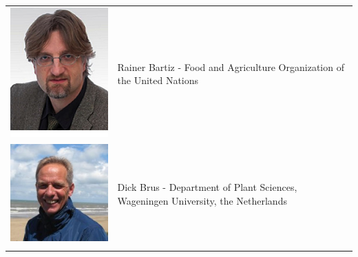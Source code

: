 \documentclass[10pt,b5paper,]{book}
\theoremstyle{definition}
\theoremstyle{definition}
\theoremstyle{definition}
\theoremstyle{remark}
\begin{document}
\begin{longtable}[]{@{}ll@{}}
\toprule
\endhead
\begin{minipage}[t]{0.11\columnwidth}\raggedright
\includegraphics{contrAuthors/Baritz.jpg}\strut
\end{minipage} & \begin{minipage}[t]{0.83\columnwidth}\raggedright
Rainer Bartiz - Food and Agriculture Organization of the United
Nations\strut
\end{minipage}\tabularnewline
\begin{minipage}[t]{0.11\columnwidth}\raggedright
\includegraphics{contrAuthors/Brus.jpg}\strut
\end{minipage} & \begin{minipage}[t]{0.83\columnwidth}\raggedright
Dick Brus - Department of Plant Sciences, Wageningen University, the
Netherlands\strut
\end{minipage}\tabularnewline
\begin{minipage}[t]{0.11\columnwidth}\raggedright

\end{minipage}
\end{longtable}
\end{document}
